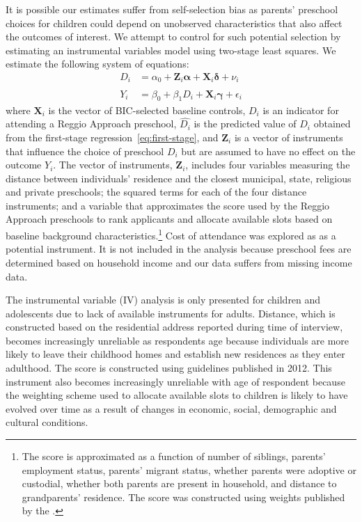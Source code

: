 It is possible our estimates suffer from self-selection bias as parents' preschool choices for children could depend on unobserved characteristics that also affect the outcomes of interest. We attempt to control for such potential selection by estimating an instrumental variables model using two-stage least squares. We estimate the following system of equations:
\begin{align}
D_i &= \alpha_0 + \bm{Z}_i \bm{\alpha} + \bm{X}_i \bm{\delta} + \nu_i \label{eq:first-stage}\\
Y_i &= \beta_0 + \beta_1 \hat{D_i} + \bm{X}_i \bm{\gamma} + \epsilon_i \label{eq:second-stage}
\end{align}
where %
$\bm{X}_i$ is the vector of BIC-selected baseline controls, $D_i$ is an indicator for attending a Reggio Approach preschool, $\hat{D_i}$ is the predicted value of $D_i$ obtained from the first-stage regression~\eqref{eq:first-stage}, and $\bm{Z}_i$ is a vector of instruments that influence the choice of preschool $D_i$ but are assumed to have no effect on the outcome $Y_i$. The vector of instruments, $\bm{Z}_i$, includes four variables measuring the distance between individuals' residence and the closest municipal, state, religious and private preschools; the squared terms for each of the four distance instruments; and a variable that approximates the score used by the Reggio Approach preschools to rank applicants and allocate available slots based on baseline background characteristics.\footnote{The score is approximated as a function of number of siblings, parents' employment status, parents' migrant status, whether parents were adoptive or custodial, whether both parents are present in household, and distance to grandparents' residence. The score was constructed using weights published by the \citet{Reggio-Emilia_2012_Criteria-admission-2013-14}.} Cost of attendance was explored as as a potential instrument. It is not included in the analysis because preschool fees are determined based on household income and our data suffers from missing income data.

The instrumental variable (IV) analysis is only presented for children and adolescents due to lack of available instruments for adults. Distance, which is constructed based on the residential address reported during time of interview, becomes increasingly unreliable as respondents age because individuals are more likely to leave their childhood homes and establish new residences as they enter adulthood. The score is constructed using guidelines published in 2012. This instrument also becomes increasingly unreliable with age of respondent because the weighting scheme used to allocate available slots to children is likely to have evolved over time as a result of changes in economic, social, demographic and cultural conditions.

